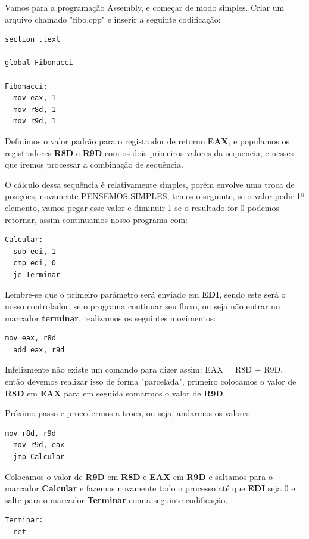Vamos para a programação Assembly, e começar de modo simples. Criar um arquivo chamado "fibo.cpp" e inserir a seguinte codificação:
\begin{lstlisting}[]
section .text

global Fibonacci

Fibonacci:
  mov eax, 1
  mov r8d, 1
  mov r9d, 1
\end{lstlisting}

Definimos o valor padrão para o registrador de retorno \textbf{EAX}, e populamos os registradores \textbf{R8D} e \textbf{R9D} com os dois primeiros valores da sequencia, e nesses que iremos processar a combinação de sequência.

O cálculo dessa sequência é relativamente simples, porém envolve uma troca de posições, novamente PENSEMOS SIMPLES, temos o seguinte, se o valor pedir 1º elemento, vamos pegar esse valor e diminuir 1 se o resultado for 0 podemos retornar, assim continuamos nosso programa com:
\begin{lstlisting}[]
Calcular:
  sub edi, 1 
  cmp edi, 0
  je Terminar
\end{lstlisting}

Lembre-se que o primeiro parâmetro será enviado em \textbf{EDI}, sendo este será o nosso controlador, se o programa continuar seu fluxo, ou seja não entrar no marcador \textbf{terminar}, realizamos os seguintes movimentos:
\begin{lstlisting}[]
  mov eax, r8d
  add eax, r9d
\end{lstlisting}

Infelizmente não existe um comando para dizer assim: {\ttfamily EAX = R8D + R9D}, então devemos realizar isso de forma "parcelada", primeiro colocamos o valor de \textbf{R8D} em \textbf{EAX} para em seguida somarmos o valor de \textbf{R9D}.

Próximo passo e procedermos a troca, ou seja, andarmos os valores:
\begin{lstlisting}[]
  mov r8d, r9d
  mov r9d, eax
  jmp Calcular
\end{lstlisting}

Colocamos o valor de \textbf{R9D} em \textbf{R8D} e \textbf{EAX} em \textbf{R9D} e saltamos para o marcador \textbf{Calcular} e fazemos novamente todo o processo até que \textbf{EDI} seja 0 e salte para o marcador \textbf{Terminar} com a seguinte codificação.
\begin{lstlisting}[]
Terminar:
  ret	
\end{lstlisting}

